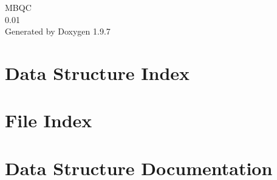 \documentclass[twoside]{book}
\newcommand{\+}{\discretionary{\mbox{\scriptsize$\hookleftarrow$}}{}{}}
\newcommand{\clearemptydoublepage}{%
    \newpage{\pagestyle{empty}\cleardoublepage}%
  }
\begin{document}
  \raggedbottom
    \hypersetup{pageanchor=false,
                bookmarksnumbered=true,
                pdfencoding=unicode
               }
  \begin{titlepage}
  \vspace*{7cm}
  \begin{center}%
  {\Large MBQC}\\
  [1ex]\large 0.\+01 \\
  \vspace*{1cm}
  {\large Generated by Doxygen 1.9.7}\\
  \end{center}
  \end{titlepage}
  \clearemptydoublepage
  \tableofcontents
  \clearemptydoublepage
  \hypersetup{pageanchor=true}



\chapter{Data Structure Index}

\chapter{File Index}

\chapter{Data Structure Documentation}


\end{document}
